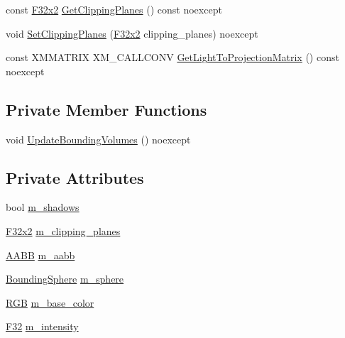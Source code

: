\begin{DoxyCompactItemize}
\item 
const \hyperlink{namespacemage_aa87237ad091f5cd7da612b8523fc108f}{F32x2} \hyperlink{classmage_1_1rendering_1_1_omni_light_a30b6cbf1fd7a6058856a491c2ce75005}{Get\+Clipping\+Planes} () const noexcept
\item 
void \hyperlink{classmage_1_1rendering_1_1_omni_light_af1334671baf6f5afeb297fb819118639}{Set\+Clipping\+Planes} (\hyperlink{namespacemage_aa87237ad091f5cd7da612b8523fc108f}{F32x2} clipping\+\_\+planes) noexcept
\item 
const X\+M\+M\+A\+T\+R\+IX X\+M\+\_\+\+C\+A\+L\+L\+C\+O\+NV \hyperlink{classmage_1_1rendering_1_1_omni_light_aa93d9722b3480fc9997761af89a6d90d}{Get\+Light\+To\+Projection\+Matrix} () const noexcept
\end{DoxyCompactItemize}
\subsection*{Private Member Functions}
\begin{DoxyCompactItemize}
\item 
void \hyperlink{classmage_1_1rendering_1_1_omni_light_a44c6dee7d24c879aab0284ac21910337}{Update\+Bounding\+Volumes} () noexcept
\end{DoxyCompactItemize}
\subsection*{Private Attributes}
\begin{DoxyCompactItemize}
\item 
bool \hyperlink{classmage_1_1rendering_1_1_omni_light_af0cb508d0333f86cf64c28f5628177d4}{m\+\_\+shadows}
\item 
\hyperlink{namespacemage_aa87237ad091f5cd7da612b8523fc108f}{F32x2} \hyperlink{classmage_1_1rendering_1_1_omni_light_a725388093feb1e5ed2ebce4f70c1729b}{m\+\_\+clipping\+\_\+planes}
\item 
\hyperlink{classmage_1_1_a_a_b_b}{A\+A\+BB} \hyperlink{classmage_1_1rendering_1_1_omni_light_ac2b5bb2e28364445c7bce70c8fa1374e}{m\+\_\+aabb}
\item 
\hyperlink{classmage_1_1_bounding_sphere}{Bounding\+Sphere} \hyperlink{classmage_1_1rendering_1_1_omni_light_af11a99e2b1500093b9bd0e3ff16b04e6}{m\+\_\+sphere}
\item 
\hyperlink{structmage_1_1_r_g_b}{R\+GB} \hyperlink{classmage_1_1rendering_1_1_omni_light_ac5aca97b5729d9c0856ed08f64976edf}{m\+\_\+base\+\_\+color}
\item 
\hyperlink{namespacemage_aa97e833b45f06d60a0a9c4fc22ae02c0}{F32} \hyperlink{classmage_1_1rendering_1_1_omni_light_af7ba6e05e5809d16ec070a2b2de47a62}{m\+\_\+intensity}
\end{DoxyCompactItemize}
